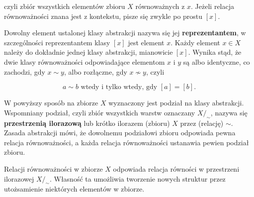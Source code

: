 czyli zbiór wszystkich elementów zbioru $X$ równoważnych z $x$.
Jeżeli relacja równoważności znana jest z kontekstu, pisze się zwykle po prostu $[x]$.

Dowolny element ustalonej klasy abstrakcji nazywa się jej \textbf{reprezentantem},
w szczególności reprezentantem klasy $[x]$ jest element $x$.
Każdy element $x \in X$ należy do dokładnie jednej klasy abstrakcji, mianowicie $[x]$.
Wynika stąd, że dwie klasy równoważności odpowiadające elementom $x$ i $y$ są albo identyczne,
co zachodzi, gdy $x\sim y$, albo rozłączne, gdy $x\nsim y$, czyli

\[
    a\sim b \text{ wtedy i tylko wtedy, gdy } [a]=[b]\text{.}
\]

W powyższy sposób na zbiorze $X$ wyznaczony jest podział na klasy abstrakcji.
Wspomniany podział, czyli zbiór wszystkich warstw oznaczany  $X/_\sim$,
nazywa się \textbf{przestrzenią ilorazową} lub krótko ilorazem (zbioru) $X$ przez (relację) $\sim$.
Zasada abstrakcji mówi, że dowolnemu podziałowi zbioru odpowiada pewna relacja równoważności,
a każda relacja równoważności ustanawia pewien podział zbioru.

Relacji równoważności w zbiorze $X$ odpowiada relacja równości w przestrzeni ilorazowej $X/_\sim$.
Własność ta umożliwia tworzenie nowych struktur przez utożsamienie niektórych elementów w zbiorze.
